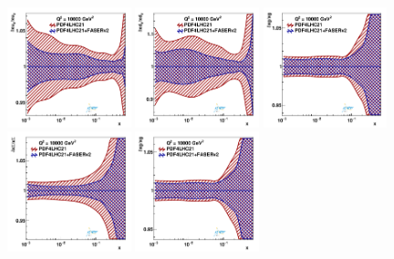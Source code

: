 \begin{figure}[t]
\centering
\includegraphics[width=0.32\textwidth]{./figs_xFitter/FASERv2_q2_10000_pdf_uv_ratio.pdf}
\includegraphics[width=0.32\textwidth]{./figs_xFitter/FASERv2_q2_10000_pdf_dv_ratio.pdf}
\includegraphics[width=0.32\textwidth]{./figs_xFitter/FASERv2_q2_10000_pdf_g_ratio.pdf}\\
\includegraphics[width=0.32\textwidth]{./figs_xFitter/FASERv2_q2_10000_pdf_Sea_ratio.pdf}
\includegraphics[width=0.32\textwidth]{./figs_xFitter/FASERv2_q2_10000_pdf_g_ratio.pdf}

\end{figure}
